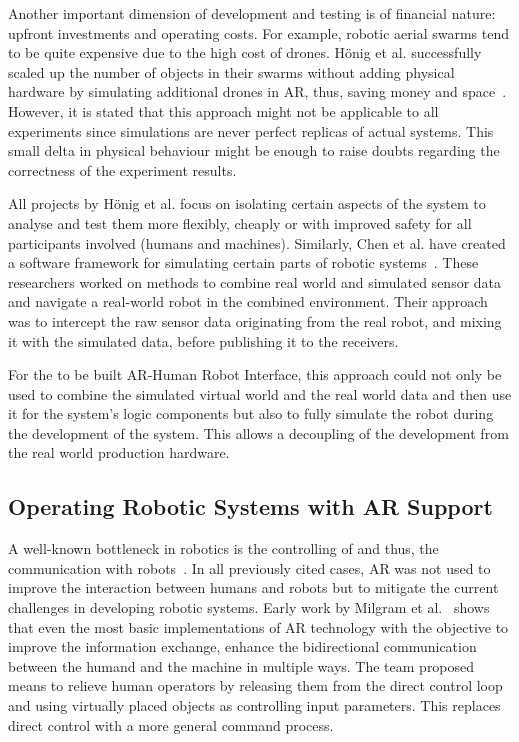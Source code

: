 Another important dimension of development and testing is of financial nature: upfront investments and operating costs. For example, robotic aerial swarms tend to be quite expensive due to the high cost of drones. Hönig et al. successfully scaled up the number of objects in their swarms without adding physical hardware by simulating additional drones in AR, thus, saving money and space~\cite{hoenig2015mixed}. However, it is stated that this approach might not be applicable to all experiments since simulations are never perfect replicas of actual systems. This small delta in physical behaviour might be enough to raise doubts regarding the correctness of the experiment results.

All projects by Hönig et al. focus on isolating certain aspects of the system to analyse and test them more flexibly, cheaply or with improved safety for all participants involved (humans and machines). Similarly, Chen et al. have created a software framework for simulating certain parts of robotic systems~\cite{chen2009mixed}. These researchers worked on methods to combine real world and simulated sensor data and navigate a real-world robot in the combined environment. Their approach was to intercept the raw sensor data originating from the real robot, and mixing it with the simulated data, before publishing it to the receivers.

For the to be built AR-Human Robot Interface, this approach could not only be used to combine the simulated virtual world and the real world data and then use it for the system's logic components but also to fully simulate the robot during the development of the system. This allows a decoupling of the development from the real world production hardware.

\subsection{Operating Robotic Systems with AR Support}
A well-known bottleneck in robotics is the controlling of and thus, the communication with robots~\cite{RoboticsScienceMag}. In all previously cited cases, AR was not used to improve the interaction between humans and robots but to mitigate the current challenges in developing robotic systems. Early work by Milgram et al.~\cite{milgram1993applications} shows that even the most basic implementations of AR technology with the objective to improve the information exchange, enhance the bidirectional communication between the humand and the machine in multiple ways. The team proposed means to relieve human operators by releasing them from the direct control loop and using virtually placed objects as controlling input parameters. This replaces direct control with a more general command process.

